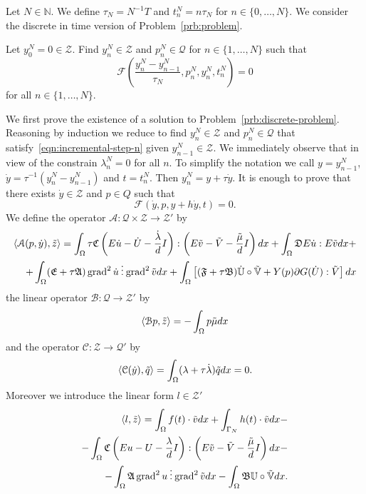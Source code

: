 Let $N\in\mathbb{N}$. We define $\tau_N=N^{-1}T$ and $t_n^N=n\tau_N$ for $n\in\{0,\dots,N\}$. We consider the discrete in time version of Problem~\ref{prb:problem}.
\begin{prb}
\label{prb:discrete-problem}
Let $y_0^N=0\in\mathscr{Z}$. Find $y_n^N\in\mathscr{Z}$ and $p_n^N\in\mathscr{Q}$ for $n\in\{1,\dots,N\}$ such that
\begin{equation}
\label{eqn:incremental-step-n}
\mathcal{F}\left(\frac{y_n^N-y_{n-1}^N}{\tau_N},p_n^N,y_n^N,t_n^N\right)=0
\end{equation}
for all $n\in\{1,\dots,N\}$.
\end{prb}
We first prove the existence of a solution to Problem~\ref{prb:discrete-problem}. Reasoning by induction we reduce to find $y_n^N\in\mathscr{Z}$ and $p_n^N\in\mathscr{Q}$ that satisfy~\eqref{eqn:incremental-step-n} given $y_{n-1}^N\in\mathscr{Z}$. We immediately observe that in view of the constrain $\lambda_n^N=0$ for all $n$. To simplify the notation we call $y=y_{n-1}^N$, $\dot y=\tau^{-1}(y^N_n-y^N_{n-1})$ and $t=t_n^N$. Then $y_n^N=y+\tau\dot y$. It is enough to prove that there exists $\dot y\in\mathscr{Z}$ and $p\in Q$ such that
\begin{equation}
\label{eqn:time-step-abstract}
\mathcal{F}(\dot y,p,y+h\dot y,t)=0.
\end{equation}
We define the operator $\mathcal{A}\colon\mathscr Q\times\mathscr{Z}\to\mathscr{Z}'$ by
\[
\begin{split}
\langle\mathcal{A}(p,\dot y),\tilde z\rangle=\int_\Omega\tau\mathfrak{C}\left(E\dot u-\dot U-\frac{\dot\lambda}{d}I\right):\left(E\tilde v-\tilde V-\frac{\tilde\mu}{d}I\right)dx+\int_\Omega\mathfrak{D}E\dot u:E\tilde vdx+\\
+\int_\Omega(\mathfrak{E}+\tau \mathfrak{A})\operatorname{grad}^2\dot u\mathbin{\vdots}\operatorname{grad}^2\tilde vdx+\int_\Omega\left[(\mathfrak{F}+\tau\mathfrak{B})\mathbb{\dot U}\circ\tilde{\mathbb{V}}+Y(p)\partial G(\dot U):\tilde V\right]dx
\end{split}
\]
the linear operator $\mathcal{B}\colon\mathscr{Q}\to\mathscr{Z}'$ by
\[
\langle\mathcal{B}p,\tilde z\rangle=-\int_\Omega p\tilde\mu dx
\]
and the operator $\mathcal{C}\colon\mathscr{Z}\to\mathscr{Q}'$ by
\[
\langle\mathcal{C}(\dot y),\tilde q\rangle=\int_\Omega(\lambda+\tau\dot\lambda)\tilde qdx=0.
\]
Moreover we introduce the linear form $l\in\mathscr{Z}'$
\[
\begin{split}
\langle l,\tilde z\rangle=\int_\Omega f(t)\cdot\tilde vdx+\int_{\Gamma_N}h(t)\cdot\tilde vdx-\\
-\int_\Omega\mathfrak{C}\left(Eu-U-\frac{\lambda}{d}I\right):\left(E\tilde v-\tilde V-\frac{\tilde\mu}{d}I\right)dx-\\
-\int_\Omega\mathfrak{A}\operatorname{grad}^2 u\mathbin{\vdots}\operatorname{grad}^2\tilde vdx-\int_\Omega\mathfrak{B}\mathbb{U}\circ\tilde{\mathbb{V}}dx.
\end{split}
\]
